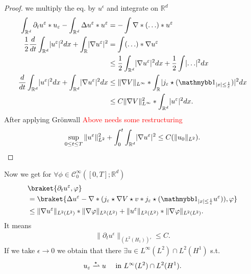    \begin{proof}
   we multiply the eq. by $u^{\epsilon} $  and integrate on $\mathbb{R}^{d} $
   \begin{align*}
     \int_{\mathbb{R}^{d} } \partial_t u^{\epsilon} * u_{\epsilon} -  \int_{\mathbb{R}^{d} } \Delta u^{\epsilon}  * u^{\epsilon}  &= - \int \nabla * (\ldots )* u^{\epsilon} \\
     \frac{1}{2}\frac{d}{dt} \int_{\mathbb{R}^{d} } \abs{u^{\epsilon} }^2 dx + \int_{\mathbb{R} } \abs{\nabla u^{\epsilon} }^2  &= \int (\ldots )* \nabla u ^{\epsilon}  \\
     &\le  \frac{1}{2} \int_{\mathbb{R}^{d} } \abs{ \nabla u^{\epsilon}  }^2 dx +  \frac{1}{2} \int  \abs{\ldots } ^2 dx \\
     \frac{d}{dt} \int_{\mathbb{R}^{d} } \abs{u^{\epsilon} }^2 dx + \int_{\mathbb{R}^{d} } \abs{\nabla u^{\epsilon} }^2 dx &\le  \|\nabla V\|_{L^{\infty} } * \int_{\mathbb{R}^{} } \abs{j_{\epsilon} \star (\cha_{\abs{x}\le \frac{1}{\epsilon}})}^2 dx\\
     &\le C \|\nabla V\|^2_{L^{\infty} } * \int_{\mathbb{R}^{d} } \abs{u^{\epsilon} }^2 dx
   .\end{align*}
   After applying Grönwall  \textcolor{Red}{Above needs some restructuring}
   \begin{align*}
     \sup_{0 \le t \le T} \|u^{\varepsilon} \|^2_{L^{2} } + \int_0^{t} \int_{\mathbb{R}^{d} } \lvert\nabla u^{\varepsilon} \rvert^2 \le  C(\|u_0\|_{L^{2} })
   .\end{align*}
   \end{proof}
   Now we get for $\forall  \phi  \in  \mathcal{C}_0^{\infty}([0,T];\mathbb{R}^{d} ) $
   \begin{align*}
     &\braket{\partial_t u^{\epsilon},\phi  } \\
    &= \braket{\Delta  u ^{\epsilon} - \nabla * (j_{\epsilon} \star  \nabla V \star  v * j_{\epsilon} \star  (\cha_{\abs{x}\le \frac{1}{\epsilon}}u^{\epsilon} )), \phi  }\\
    &\le \|\nabla u ^{\epsilon} \|_{L^{2}(L^{2} ) } * \|\nabla \phi \|_{L^{2}(L^{2} ) } + \|u^{\epsilon} \|_{L^{2}(L^{2} ) } * \|\nabla \phi \|_{L^{2}(L^{2} ) }
   .\end{align*}
   It means 
   \begin{align*}
     \|\partial_t u^{\epsilon} \|_{(L^{2}(H_{1}) )'}\le C
   .\end{align*}
   If we take $\epsilon \to  0$ we obtain that there $\exists  u \in L^{\infty}(L^{2} ) \cap L^{2}(H^{1} ) $ s.t. 
   \begin{align*}
     u_{\epsilon} \xrightharpoonup{\star } u  \quad \text{ in } L^{\infty}(L^{2} ) \cap L^{2}(H^{1} )  
   .\end{align*}
